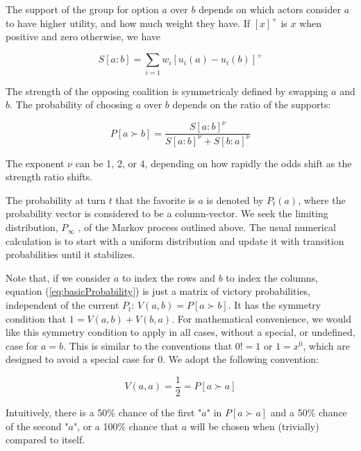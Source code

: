 \documentclass[a4paper,10pt]{article}
\begin{document}
The support of the group for option $a$  over $b$   depends on which actors consider $a$
  to have higher utility, and how much weight they have. If $\left[x\right]^{+}$
  is $x$
  when positive and zero otherwise, we have

\begin{equation} \label{eq:basicSupport}
S\left[a:b\right]=\sum_{i=1}w_{i}\left[u_{i}\left(a\right)-u_{i}\left(b\right)\right]^{+}
\end{equation} 
 

The strength of the opposing coalition is symmetricaly defined by swapping $a$  and $b$.
The probability of choosing $a$   over $b$   depends on the ratio of the supports:


\begin{equation} \label{eq:basicProbability}
P\left[a\succ b\right] = \frac{ S[a:b]^\nu }{S[a:b]^\nu +S[b:a]^\nu}
\end{equation}

The exponent $\nu$ can be 1, 2, or 4, depending on how rapidly the odds shift as the strength ratio shifts.


The probability at turn $t$   that the favorite is $a$
  is denoted by $P_{t}(a)$, where the probability vector is considered to be a column-vector.
 We seek the limiting distribution, $P_{\infty}$ , of the Markov process outlined above.
The usual numerical calculation is to start with a uniform distribution and update it with transition probabilities until it stabilizes.


Note that, if we consider $a$ to index the rows and $b$ to index the columns, equation (\ref{eq:basicProbability}) is just
 a matrix of victory probabilities,
independent of the current $P_t$: $V(a,b) = P[a \succ b]$.  It has the symmetry
condition that $1 =V(a,b) +V(b,a)$. For mathematical convenience, we would like this symmetry condition
to apply in all cases, without a special, or  undefined, case for $a=b$. This is similar to 
the conventions that $0!=1$ or $1=x^0$, which are designed to avoid a special case for 0.
We adopt the following convention:


\begin{equation} \label{eq:trivialProbability}
V(a,a)= \frac{1}{2}  =  P[a \succ a]
\end{equation}

 Intuitively, there is a 50\% chance of the first "$a$" in $ P[a \succ a]$ and a 50\% chance of the 
second "$a$", or a 100\% chance
that $a$ will be chosen when (trivially) compared to itself.
\end{document}
